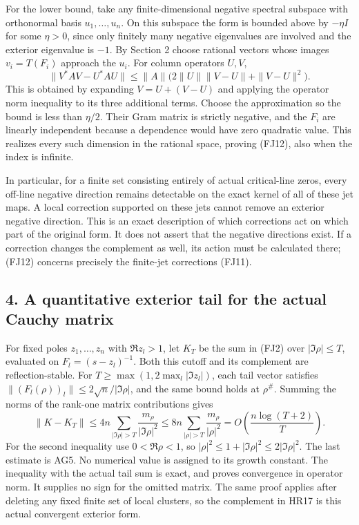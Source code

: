 \documentclass[
  10pt,
  a4paper,
]{article}
\begin{document}
For the lower bound, take any finite-dimensional negative spectral
subspace with orthonormal basis \(u_1,\ldots,u_n\). On this subspace the
form is bounded above by \(-\eta I\) for some \(\eta>0\), since only
finitely many negative eigenvalues are involved and the exterior
eigenvalue is \(-1\). By Section 2 choose rational vectors whose images
\(v_i=T(F_i)\) approach the \(u_i\). For column operators \(U,V\), \[
\|V^*AV-U^*AU\|
 \le\|A\|\bigl(2\|U\|\|V-U\|+\|V-U\|^2\bigr).
\tag{FJ13}
\] This is obtained by expanding \(V=U+(V-U)\) and applying the operator
norm inequality to its three additional terms. Choose the approximation
so the bound is less than \(\eta/2\). Their Gram matrix is strictly
negative, and the \(F_i\) are linearly independent because a dependence
would have zero quadratic value. This realizes every such dimension in
the rational space, proving (FJ12), also when the index is infinite.

In particular, for a finite set consisting entirely of actual
critical-line zeros, every off-line negative direction remains
detectable on the exact kernel of all of these jet maps. A local
correction supported on these jets cannot remove an exterior negative
direction. This is an exact description of which corrections act on
which part of the original form. It does not assert that the negative
directions exist. If a correction changes the complement as well, its
action must be calculated there; (FJ12) concerns precisely the
finite-jet corrections (FJ11).

\subsection{4. A quantitative exterior tail for the actual Cauchy
matrix}\label{a-quantitative-exterior-tail-for-the-actual-cauchy-matrix}

For fixed poles \(z_1,\ldots,z_n\) with \(\Re z_l>1\), let \(K_T\) be
the sum in (FJ2) over \(|\Im\rho|\le T\), evaluated on
\(F_l=(s-z_l)^{-1}\). Both this cutoff and its complement are
reflection-stable. For \(T\ge\max(1,2\max_l|\Im z_l|)\), each tail
vector satisfies \(\|(F_l(\rho))_l\|\le2\sqrt n/|\Im\rho|\), and the
same bound holds at \(\rho^\#\). Summing the norms of the rank-one
matrix contributions gives \[
\|K-K_T\|\le4n\sum_{|\Im\rho|>T}\frac{m_\rho}{|\Im\rho|^2}
 \le8n\sum_{|\rho|>T}\frac{m_\rho}{|\rho|^2}
 =O\left(\frac{n\log(T+2)}T\right).
\tag{FJ14}
\] For the second inequality use \(0<\Re\rho<1\), so
\(|\rho|^2\le1+|\Im\rho|^2\le2|\Im\rho|^2\). The last estimate is AG5.
No numerical value is assigned to its growth constant. The inequality
with the actual tail sum is exact, and proves convergence in operator
norm. It supplies no sign for the omitted matrix. The same proof applies
after deleting any fixed finite set of local clusters, so the complement
in HR17 is this actual convergent exterior form.
\end{document}
